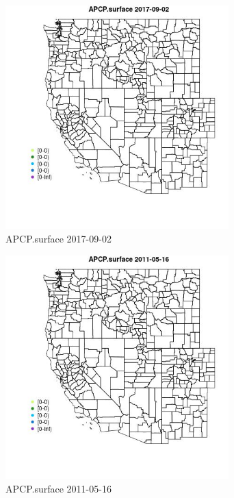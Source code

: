 \begin{figure} 
\centering  
\includegraphics[width=0.77\textwidth]{Code_Outputs/Report_ML_input_PM25_Step4_part_e_de_duplicated_aveswNAs_MapObsAPCPsurface2017-09-02.jpg} 
\caption{\label{fig:Report_ML_input_PM25_Step4_part_e_de_duplicated_aveswNAsMapObsAPCPsurface2017-09-02}APCP.surface 2017-09-02} 
\end{figure} 
 

\begin{figure} 
\centering  
\includegraphics[width=0.77\textwidth]{Code_Outputs/Report_ML_input_PM25_Step4_part_e_de_duplicated_aveswNAs_MapObsAPCPsurface2011-05-16.jpg} 
\caption{\label{fig:Report_ML_input_PM25_Step4_part_e_de_duplicated_aveswNAsMapObsAPCPsurface2011-05-16}APCP.surface 2011-05-16} 
\end{figure} 
 

